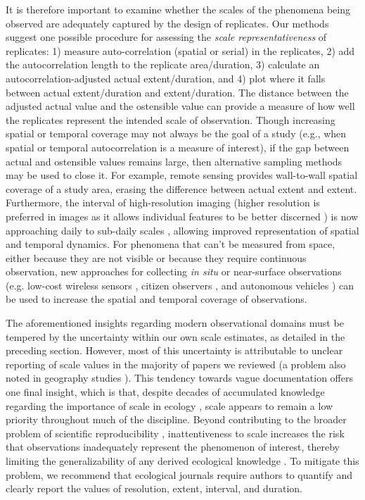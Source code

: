 \documentclass[12pt]{article}
\begin{document}
It is therefore important to examine whether the scales of the phenomena being observed are adequately captured by the design of replicates. Our methods suggest one possible procedure for assessing the \emph{scale representativeness} of replicates: 1) measure auto-correlation (spatial or serial) in the replicates, 2) add the autocorrelation length to the replicate area/duration, 3) calculate an autocorrelation-adjusted actual extent/duration, and 4) plot where it falls between actual extent/duration and extent/duration. The distance between the adjusted actual value and the ostensible value can provide a measure of how well the replicates represent the intended scale of observation. Though increasing spatial or temporal coverage may not always be the goal of a study (e.g., when spatial or temporal autocorrelation is a measure of interest), if the gap between actual and ostensible values remains large, then alternative sampling methods may be used to close it. For example, remote sensing provides wall-to-wall spatial coverage of a study area, erasing the difference between actual extent and extent. Furthermore, the interval of high-resolution imaging (higher resolution is preferred in images as it allows individual features to be better discerned \cite{dark_modifiable_2007, hay_comparison_2003}) is now approaching daily to sub-daily scales \cite{drusch_sentinel-2:_2012, hand_startup_2015}, allowing improved representation of spatial and temporal dynamics. For phenomena that can't be measured from space, either because they are not visible or because they require continuous observation, new approaches for collecting \emph{in situ} or near-surface observations (e.g. low-cost wireless sensors \cite{wolf_gsm-based_2012, collins_new_2006, porter_wireless_2005}, citizen observers \cite{dickinson_current_2012}, and autonomous vehicles \cite{anderson_lightweight_2013}) can be used to increase the spatial and temporal coverage of observations.

The aforementioned insights regarding modern observational domains must be tempered by the uncertainty within our own scale estimates, as detailed in the preceding section. However, most of this uncertainty is attributable to unclear reporting of scale values in the majority of papers we reviewed (a problem also noted in geography studies \cite{margulies_ambiguous_2016}). This tendency towards vague documentation offers one final insight, which is that, despite decades of accumulated knowledge regarding the importance of scale in ecology \cite{levin_problem_1992, wiens_spatial_1989, chave_problem_2013, wheatley_factors_2009}, scale appears to remain a low priority throughout much of the discipline. Beyond contributing to the broader problem of scientific reproducibility \cite{baker_1500_2016}, inattentiveness to scale increases the risk that observations inadequately represent the phenomenon of interest, thereby limiting the generalizability of any derived ecological knowledge \cite{margulies_ambiguous_2016, wheatley_factors_2009, wiens_spatial_1989}. To mitigate this problem, we recommend that ecological journals require authors to quantify and clearly report the values of resolution, extent, interval, and duration.  
\end{document}
